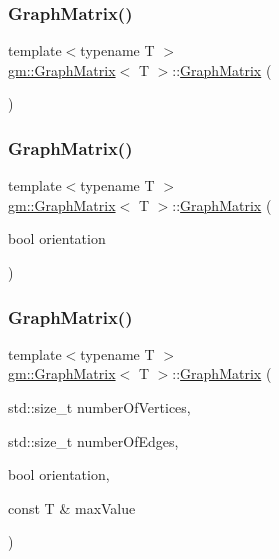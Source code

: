 \subsubsection{\texorpdfstring{Graph\+Matrix()}{GraphMatrix()}\hspace{0.1cm}{\footnotesize\ttfamily [1/3]}}
{\footnotesize\ttfamily template$<$typename T $>$ \\
\mbox{\hyperlink{classgm_1_1_graph_matrix}{gm\+::\+Graph\+Matrix}}$<$ T $>$\+::\mbox{\hyperlink{classgm_1_1_graph_matrix}{Graph\+Matrix}} (\begin{DoxyParamCaption}{ }\end{DoxyParamCaption})}

\mbox{\label{classgm_1_1_graph_matrix_a24ab316e39e3a26c9208c81af0e3e48d}} 
\subsubsection{\texorpdfstring{Graph\+Matrix()}{GraphMatrix()}\hspace{0.1cm}{\footnotesize\ttfamily [2/3]}}
{\footnotesize\ttfamily template$<$typename T $>$ \\
\mbox{\hyperlink{classgm_1_1_graph_matrix}{gm\+::\+Graph\+Matrix}}$<$ T $>$\+::\mbox{\hyperlink{classgm_1_1_graph_matrix}{Graph\+Matrix}} (\begin{DoxyParamCaption}\item[{bool}]{orientation }\end{DoxyParamCaption})}

\mbox{\label{classgm_1_1_graph_matrix_a091be187f54bd8fc750696c4e97e9552}} 
\subsubsection{\texorpdfstring{Graph\+Matrix()}{GraphMatrix()}\hspace{0.1cm}{\footnotesize\ttfamily [3/3]}}
{\footnotesize\ttfamily template$<$typename T $>$ \\
\mbox{\hyperlink{classgm_1_1_graph_matrix}{gm\+::\+Graph\+Matrix}}$<$ T $>$\+::\mbox{\hyperlink{classgm_1_1_graph_matrix}{Graph\+Matrix}} (\begin{DoxyParamCaption}\item[{std\+::size\+\_\+t}]{number\+Of\+Vertices,  }\item[{std\+::size\+\_\+t}]{number\+Of\+Edges,  }\item[{bool}]{orientation,  }\item[{const T \&}]{max\+Value }\end{DoxyParamCaption})}


